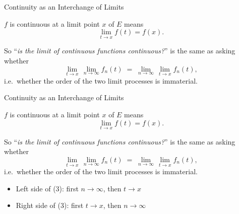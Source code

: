 \documentclass[aspectratio=169,12pt,t]{beamer}
\begin{document}
{%
\begin{frame}{Continuity as an Interchange of Limits}

  \begin{hlbox}  $f$ is continuous at a limit point $x$ of $E$ means
  \[
    \lim_{t \to x} f(t) = f(x).
  \]

  \vspace{0.3em}
  So ``\emph{is the limit of continuous functions continuous?}''
  is the same as asking whether
  \begin{equation}
    \lim_{t \to x}\, \lim_{n \to \infty} f_n(t)
    \;=\;
    \lim_{n \to \infty}\, \lim_{t \to x} f_n(t), \tag{3}
  \end{equation}
  i.e.\ whether the \alert{order of the two limit processes is immaterial}.
  \end{hlbox}

\end{frame}

\begin{frame}{Continuity as an Interchange of Limits}

  \begin{hlbox}  $f$ is continuous at a limit point $x$ of $E$ means
  \[
    \lim_{t \to x} f(t) = f(x).
  \]

  \vspace{0.3em}
  So ``\emph{is the limit of continuous functions continuous?}''
  is the same as asking whether
  \begin{equation}
    \lim_{t \to x}\, \lim_{n \to \infty} f_n(t)
    \;=\;
    \lim_{n \to \infty}\, \lim_{t \to x} f_n(t), \tag{3}
  \end{equation}
  i.e.\ whether the \alert{order of the two limit processes is immaterial}.

  \vspace{0.3em}
  \begin{itemize}
    \item Left side of (3): first $n \to \infty$, then $t \to x$
    \item Right side of (3): first $t \to x$, then $n \to \infty$
  \end{itemize}
  \end{hlbox}


\end{frame}}
\end{document}
